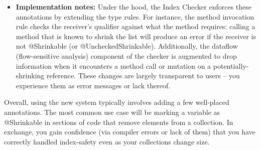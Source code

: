 \begin{itemize}
    \item
      \textbf{Implementation notes:}
        Under the hood, the Index Checker enforces these annotations by extending the type rules.
        For instance, the method invocation rule checks the receiver’s qualifier against what the
        method requires: calling a method that is known to shrink the list will produce an error if
        the receiver is not @Shrinkable (or @UncheckedShrinkable). Additionally, the dataflow
        (flow-sensitive analysis) component of the checker is augmented to drop information when it
        encounters a method call or mutation on a potentially-shrinking reference. These changes are
        largely transparent to users – you experience them as error messages or lack thereof.
    \end{itemize}
    Overall, using the new system typically involves adding a few well-placed annotations. The
    most common use case will be marking a variable as @Shrinkable in sections of code that
    remove elements from a collection. In exchange, you gain confidence (via compiler errors or
    lack of them) that you have correctly handled index-safety even as your collections change size.


